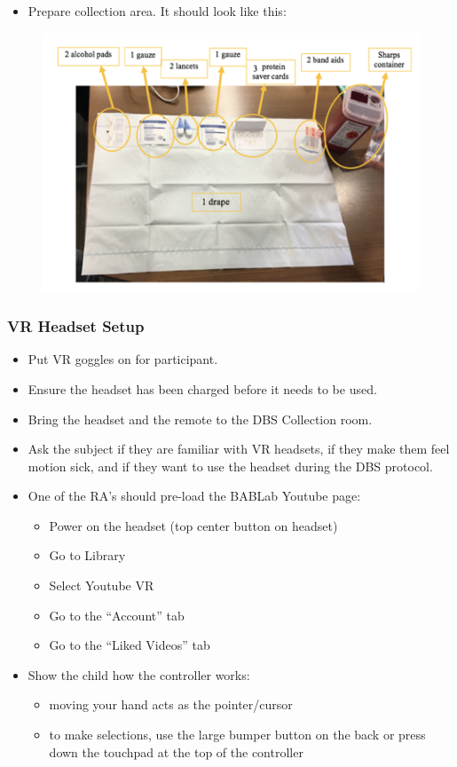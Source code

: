 \documentclass[]{book}
\providecommand{\tightlist}{%
  \setlength{\itemsep}{0pt}\setlength{\parskip}{0pt}}
\begin{document}
\begin{itemize}
\tightlist
\item
  Prepare collection area. It should look like this:
\end{itemize}

\begin{figure}
\centering
\includegraphics{images/dbs/2.png}
\caption{}
\end{figure}

\hypertarget{vr-headset-setup}{%
\subsubsection{VR Headset Setup}\label{vr-headset-setup}}

\begin{itemize}
\tightlist
\item
  Put VR goggles on for participant.
\item
  Ensure the headset has been charged before it needs to be used.
\item
  Bring the headset and the remote to the DBS Collection room.
\item
  Ask the subject if they are familiar with VR headsets, if they make them feel motion sick, and if they want to use the headset during the DBS protocol.
\item
  One of the RA's should pre-load the BABLab Youtube page:

  \begin{itemize}
  \tightlist
  \item
    Power on the headset (top center button on headset)
  \item
    Go to Library
  \item
    Select Youtube VR
  \item
    Go to the ``Account'' tab
  \item
    Go to the ``Liked Videos'' tab
  \end{itemize}
\item
  Show the child how the controller works:

  \begin{itemize}
  \tightlist
  \item
    moving your hand acts as the pointer/cursor
  \item
    to make selections, use the large bumper button on the back or press down the touchpad at the top of the controller
  \end{itemize}
\end{itemize}
\end{document}
